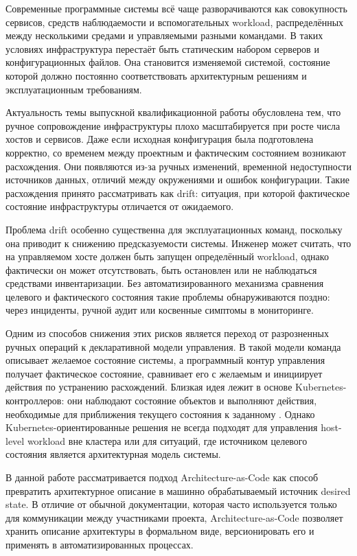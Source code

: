 \introduction %

Современные программные системы всё чаще разворачиваются как совокупность сервисов, средств наблюдаемости и вспомогательных workload, распределённых между несколькими средами и управляемыми разными командами. В таких условиях инфраструктура перестаёт быть статическим набором серверов и конфигурационных файлов. Она становится изменяемой системой, состояние которой должно постоянно соответствовать архитектурным решениям и эксплуатационным требованиям.

Актуальность темы выпускной квалификационной работы обусловлена тем, что ручное сопровождение инфраструктуры плохо масштабируется при росте числа хостов и сервисов. Даже если исходная конфигурация была подготовлена корректно, со временем между проектным и фактическим состоянием возникают расхождения. Они появляются из-за ручных изменений, временной недоступности источников данных, отличий между окружениями и ошибок конфигурации. Такие расхождения принято рассматривать как drift: ситуация, при которой фактическое состояние инфраструктуры отличается от ожидаемого.

Проблема drift особенно существенна для эксплуатационных команд, поскольку она приводит к снижению предсказуемости системы. Инженер может считать, что на управляемом хосте должен быть запущен определённый workload, однако фактически он может отсутствовать, быть остановлен или не наблюдаться средствами инвентаризации. Без автоматизированного механизма сравнения целевого и фактического состояния такие проблемы обнаруживаются поздно: через инциденты, ручной аудит или косвенные симптомы в мониторинге.

Одним из способов снижения этих рисков является переход от разрозненных ручных операций к декларативной модели управления. В такой модели команда описывает желаемое состояние системы, а программный контур управления получает фактическое состояние, сравнивает его с желаемым и инициирует действия по устранению расхождений. Близкая идея лежит в основе Kubernetes-контроллеров: они наблюдают состояние объектов и выполняют действия, необходимые для приближения текущего состояния к заданному \cite{kubernetes_controllers}. Однако Kubernetes-ориентированные решения не всегда подходят для управления host-level workload вне кластера или для ситуаций, где источником целевого состояния является архитектурная модель системы.

В данной работе рассматривается подход Architecture-as-Code как способ превратить архитектурное описание в машинно обрабатываемый источник desired state. В отличие от обычной документации, которая часто используется только для коммуникации между участниками проекта, Architecture-as-Code позволяет хранить описание архитектуры в формальном виде, версионировать его и применять в автоматизированных процессах.

